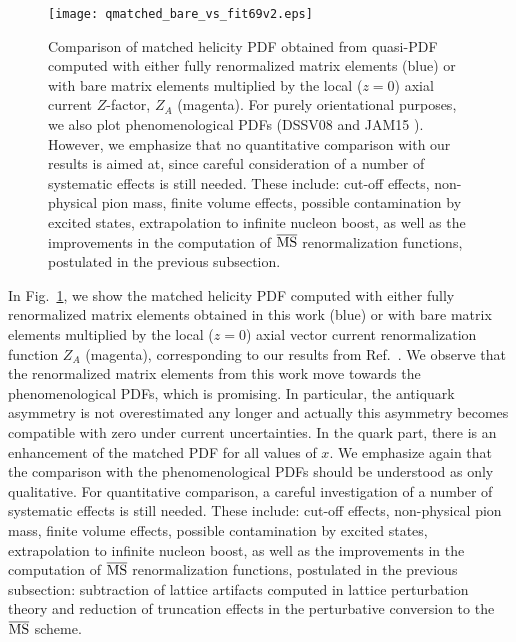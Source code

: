 \documentclass[12pt,tighten,nofootinbib,amssymb,floatfix]{article}
\newcommand{\MSb}{{\overline{\rm MS}}}
\begin{document}
\bigskip
\begin{figure}[h]
\centering
\texttt{[image: qmatched\_bare\_vs\_fit69v2.eps]}\,\,\,
\vspace*{-0.3cm}
\begin{minipage}{15cm}
\hspace*{3cm}
\caption{\small{Comparison of matched helicity PDF obtained from quasi-PDF computed with either fully renormalized matrix elements (blue) 
or with bare matrix elements multiplied by the local ($z{=}0$) axial current $Z$-factor, $Z_A$ (magenta). For purely orientational purposes, 
we also plot phenomenological PDFs (DSSV08 \cite{deFlorian:2009vb} and JAM15 \cite{Sato:2016tuz}).
However, we emphasize that no quantitative comparison with our results is aimed at, since careful consideration of a number of systematic effects is still needed. These include:
cut-off effects, non-physical pion mass, finite volume effects, possible contamination by excited states, extrapolation to infinite nucleon boost, as well as the improvements in the computation of $\MSb$ renormalization functions, postulated in the previous subsection.}}
\label{fig:matched} 
\end{minipage}
\end{figure}

\medskip
In Fig.~\ref{fig:matched}, we show the matched helicity PDF computed with either fully renormalized matrix elements obtained in this work (blue) or with bare matrix elements multiplied by the local ($z{=}0$) axial vector current renormalization function $Z_A$ (magenta), corresponding to our results from Ref.~\cite{Alexandrou:2016jqi}.
We observe that the renormalized matrix elements from this work move towards the phenomenological PDFs, which is promising.
In particular, the antiquark asymmetry is not overestimated any longer and actually this asymmetry becomes compatible with zero under current uncertainties.
In the quark part, there is an enhancement of the matched PDF for all values of $x$.
We emphasize again that the comparison with the phenomenological PDFs should be understood as only qualitative.
For quantitative comparison, a careful investigation of a number of systematic effects is still needed. These include:
cut-off effects, non-physical pion mass, finite volume effects, possible contamination by excited states, extrapolation 
to infinite nucleon boost, as well as the improvements in the computation of $\MSb$ renormalization functions, 
postulated in the previous subsection: subtraction of lattice artifacts computed in lattice perturbation theory and 
reduction of truncation effects in the perturbative conversion to the $\MSb$ scheme.
\end{document}

